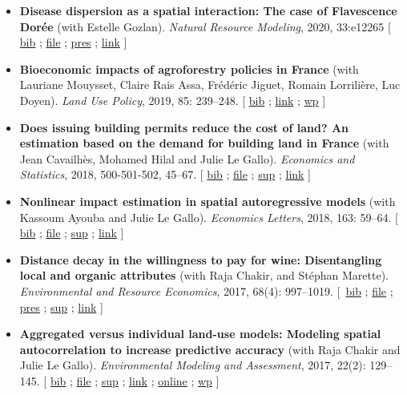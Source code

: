 \documentclass[11pt, a4paper]{./style}
\begin{document}
\begin{itemize}
\item \textbf{Disease dispersion as a spatial interaction: The case of
Flavescence Dorée} (with Estelle Gozlan). \emph{Natural Resource
Modeling}, 2020, 33:e12265 [ \href{bib/SPFD.bib}{bib} ; \href{doc/SPFD-FILE.pdf}{file} ; \href{doc/SPFD-PRES.pdf}{pres} ; \href{https://onlinelibrary.wiley.com/doi/full/10.1111/nrm.12265}{link} ]
\item \textbf{Bioeconomic impacts of agroforestry policies in France} (with
Lauriane Mouysset, Claire Rais Assa, Frédéric Jiguet, Romain
Lorrilière, Luc Doyen). \emph{Land Use Policy}, 2019, 85: 239--248.  [
\href{bib/BIOFOR.bib}{bib} ; \href{https://www.sciencedirect.com/science/article/abs/pii/S0264837718308160}{link} ;  \href{http://cahiersdugretha.u-bordeaux4.fr/2017/2017-05.pdf}{wp} ]
\item \textbf{Does issuing building permits reduce the cost of land? An
estimation based on the demand for building land in France} (with
Jean Cavailhès, Mohamed Hilal and Julie Le Gallo). \emph{Economics and
Statistics}, 2018, 500-501-502, 45--67.  [ \href{bib/PCPX.bib}{bib} ; \href{doc/PCPX-FILE.pdf}{file} ; \href{doc/PCPX-SUP.pdf}{sup} ;
\href{https://insee.fr/en/statistiques/3621981?sommaire=3622133}{link} ]
\item \textbf{Nonlinear impact estimation in spatial autoregressive models}
(with Kassoum Ayouba and Julie Le Gallo). \emph{Economics Letters},
2018, 163: 59--64. [ \href{bib/NLSP.bib}{bib} ; \href{doc/NLSP-FILE.pdf}{file} ; \href{doc/NLSP-SUP.pdf}{sup} ; \href{https://www.sciencedirect.com/science/article/pii/S0165176517304846}{link} ]
\item \textbf{Distance decay in the willingness to pay for wine: Disentangling
local and organic attributes} (with Raja Chakir, and Stéphan
Marette). \emph{Environmental and Resource Economics}, 2017, 68(4):
997--1019. [~\href{bib/DWTP.bib}{bib} ; \href{doc/DWTP-FILE.pdf}{file} ; \href{doc/DWTP-PRES.pdf}{pres} ; \href{doc/DWTP-SUP.pdf}{sup} ; \href{https://link.springer.com/article/10.1007/s10640-016-0057-8}{link} ]
\item \textbf{Aggregated versus individual land-use models: Modeling spatial
autocorrelation to increase predictive accuracy} (with Raja
Chakir and Julie Le Gallo). \emph{Environmental Modeling and
Assessment}, 2017, 22(2): 129--145. [ \href{bib/LUMP.bib}{bib} ; \href{doc/LUMP-FILE.pdf}{file} ; \href{doc/LUMP-SUP.pdf}{sup} ; \href{https://link.springer.com/article/10.1007/s10666-016-9523-5}{link} ;
\href{https://github.com/jsay/spatial-pred-R}{online} ;  \href{https://www6.versailles-grignon.inra.fr/economie\_publique/Media/fichiers/Working-Papers/Working-Papers-2014/WP\_2014\_02}{wp} ]

\end{itemize}
\end{document}

